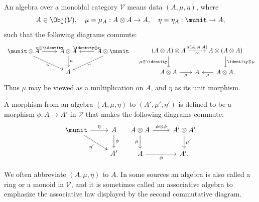 \begin{definition}[Algebra]\label{def:algebra-monoidal}
	An algebra over a monoidal category $\mathcal{V}$ means data
	$(A,\mu,\eta)$, where
	\[ A \in \Obj(\mathcal{V}), \quad \mu = \mu_A: A \otimes A \to A, \quad \eta = \eta_A: \munit \to A, \]
	such that the following diagrams commute:
	\begin{equation*}\begin{gathered}
		\begin{tikzcd}
			\munit \otimes A \arrow[r, "{\eta \otimes \identity}"] \arrow[rd, "\sim"' sloped] & A \otimes A \arrow[d, "\mu"] & A \otimes \munit \arrow[l, "{\identity \otimes \eta}"'] \arrow[ld, "\sim"' sloped] \\
			& A &
		\end{tikzcd} \quad
		\begin{tikzcd}[column sep=tiny]
			(A \otimes A) \otimes A \arrow[rr, "{a(A, A, A)}", "\sim"'] \arrow[d, "{\mu \otimes \identity}"'] & & A \otimes (A \otimes A) \arrow[d, "{\identity \otimes \mu}"] \\
			A \otimes A \arrow[r, "\mu"'] & A & A \otimes A \arrow[l, "\mu"] .
		\end{tikzcd}
	\end{gathered}\end{equation*}
	Thus $\mu$ may be viewed as a multiplication on $A$, and $\eta$ as its
	unit morphism.
	
	A morphism from an algebra $(A,\mu,\eta)$ to
	$(A',\mu',\eta')$ is defined to be a morphism $\phi:A\to A'$ in
	$\mathcal{V}$ that makes the following diagrams commute:
	\[\begin{tikzcd}
		\munit \arrow[r, "\eta"] \arrow[rd, "{\eta'}"'] & A \arrow[d, "\phi"] \\
		& A'
	\end{tikzcd} \quad \begin{tikzcd}
		A \otimes A \arrow[d, "\mu"'] \arrow[r, "{\phi \otimes \phi}"] & A' \otimes A' \arrow[d, "{\mu'}"] \\
		A \arrow[r, "\phi"'] & A' .
	\end{tikzcd}\]
\end{definition}

We often abbreviate $(A,\mu,\eta)$ to $A$. In some sources an algebra is also
called a ring or a monoid in $\mathcal{V}$, and it is sometimes called an
associative algebra to emphasize the associative law displayed by the second
commutative diagram.

